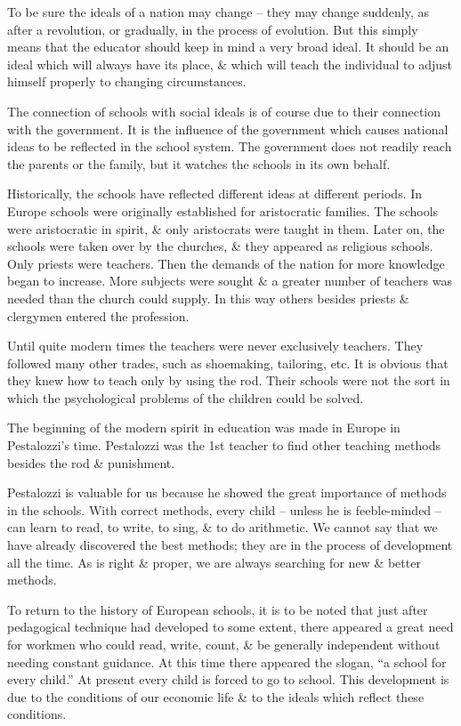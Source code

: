 \documentclass{article}
\begin{document}
To be sure the ideals of a nation may change -- they may change suddenly, as after a revolution, or gradually, in the process of evolution. But this simply means that the educator should keep in mind a very broad ideal. It should be an ideal which will always have its place, \& which will teach the individual to adjust himself properly to changing circumstances.

The connection of schools with social ideals is of course due to their connection with the government. It is the influence of the government which causes national ideas to be reflected in the school system. The government does not readily reach the parents or the family, but it watches the schools in its own behalf.

Historically, the schools have reflected different ideas at different periods. In Europe schools were originally established for aristocratic families. The schools were aristocratic in spirit, \& only aristocrats were taught in them. Later on, the schools were taken over by the churches, \& they appeared as religious schools. Only priests were teachers. Then the demands of the nation for more knowledge began to increase. More subjects were sought \& a greater number of teachers was needed than the church could supply. In this way others besides priests \& clergymen entered the profession.

Until quite modern times the teachers were never exclusively teachers. They followed many other trades, such as shoemaking, tailoring, etc. It is obvious that they knew how to teach only by using the rod. Their schools were not the sort in which the psychological problems of the children could be solved.

The beginning of the modern spirit in education was made in Europe in Pestalozzi's time. Pestalozzi was the 1st teacher to find other teaching methods besides the rod \& punishment.

Pestalozzi is valuable for us because he showed the great importance of methods in the schools. With correct methods, every child -- unless he is feeble-minded -- can learn to read, to write, to sing, \& to do arithmetic. We cannot say that we have already discovered the best methods; they are in the process of development all the time. As is right \& proper, we are always searching for new \& better methods.

To return to the history of European schools, it is to be noted that just after pedagogical technique had developed to some extent, there appeared a great need for workmen who could read, write, count, \& be generally independent without needing constant guidance. At this time there appeared the slogan, ``a school for every child.'' At present every child is forced to go to school. This development is due to the conditions of our economic life \& to the ideals which reflect these conditions.
\end{document}

